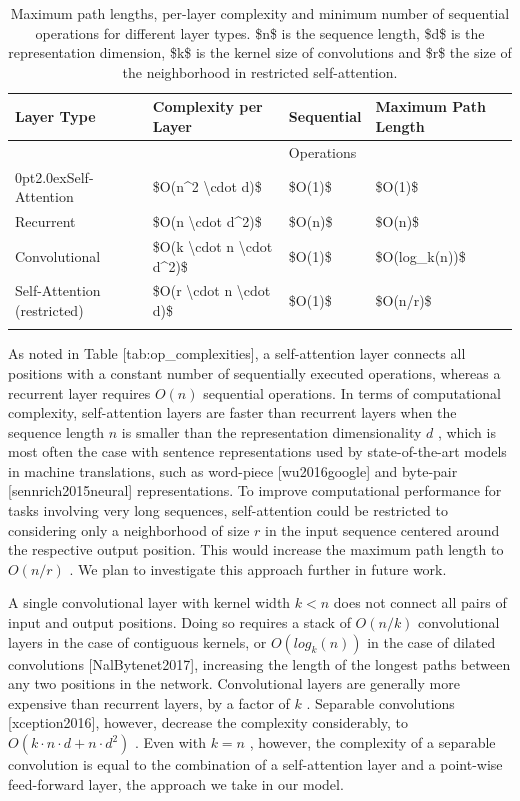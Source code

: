 \documentclass[11pt,a4paper]{article}
\begin{document}
\begin{table}[h]
\caption{Maximum path lengths, per-layer complexity and minimum number of sequential operations for different layer types.  \$n\$  is the sequence length,  \$d\$  is the representation dimension,  \$k\$  is the kernel size of convolutions and  \$r\$  the size of the neighborhood in restricted self-attention.}
\begin{tabular}{|l|l|l|l|}
\hline
Layer Type & Complexity per Layer & Sequential & Maximum Path Length \\ \hline
 &  & Operations &  \\ \hline
0pt2.0exSelf-Attention & \$O(n\textasciicircum{}2 \textbackslash{}cdot d)\$ & \$O(1)\$ & \$O(1)\$ \\ \hline
Recurrent & \$O(n \textbackslash{}cdot d\textasciicircum{}2)\$ & \$O(n)\$ & \$O(n)\$ \\ \hline
Convolutional & \$O(k \textbackslash{}cdot n \textbackslash{}cdot d\textasciicircum{}2)\$ & \$O(1)\$ & \$O(log\_k(n))\$ \\ \hline
Self-Attention (restricted) & \$O(r \textbackslash{}cdot n \textbackslash{}cdot d)\$ & \$O(1)\$ & \$O(n/r)\$ \\ \hline
 &  &  &  \\ \hline
\end{tabular}
\end{table}

As noted in Table [tab:op\_complexities], a self-attention layer connects all positions with a constant number of sequentially executed operations, whereas a recurrent layer requires  $O(n)$  sequential operations. In terms of computational complexity, self-attention layers are faster than recurrent layers when the sequence length  $n$  is smaller than the representation dimensionality  $d$ , which is most often the case with sentence representations used by state-of-the-art models in machine translations, such as word-piece [wu2016google] and byte-pair [sennrich2015neural] representations. To improve computational performance for tasks involving very long sequences, self-attention could be restricted to considering only a neighborhood of size  $r$  in the input sequence centered around the respective output position. This would increase the maximum path length to  $O(n/r)$ . We plan to investigate this approach further in future work.

A single convolutional layer with kernel width  $k < n$  does not connect all pairs of input and output positions. Doing so requires a stack of  $O(n/k)$  convolutional layers in the case of contiguous kernels, or  $O(log_k(n))$  in the case of dilated convolutions [NalBytenet2017], increasing the length of the longest paths between any two positions in the network. Convolutional layers are generally more expensive than recurrent layers, by a factor of  $k$ . Separable convolutions [xception2016], however, decrease the complexity considerably, to  $O(k \cdot n \cdot d + n \cdot d^2)$ . Even with  $k=n$ , however, the complexity of a separable convolution is equal to the combination of a self-attention layer and a point-wise feed-forward layer, the approach we take in our model.
\end{document}
